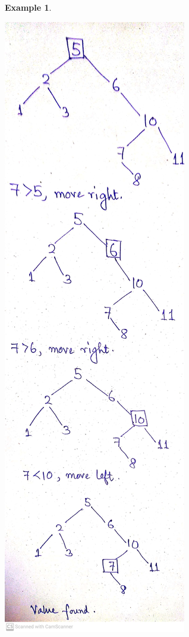 \documentclass[10pt, a4paper]{extarticle}
\theoremstyle{definition}
\newtheorem{eg}{Example}
\begin{document}
\begin{eg}
\begin{center}
			\includegraphics[scale=0.1]{bst2.jpg}\\
		\end{center}
	\end{eg}
\end{document}
